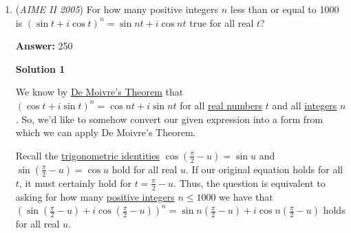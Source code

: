 \begin{enumerate}
 



\textbf{Solution 2}

Call our desired length $x$. Note for any $X$ on $\overline{AB}$ and $Y$ on $\overline{O_1O_2}$ such that $\overline{XY}\perp\overline{AB}$ that the function $f$ such that $f(\overline{O_1Y})=\overline{XY}$ is linear. Since $(0,4)$ and $(14,10)$, we can quickly interpolate that $f(10)=\overline{O_3T}=\frac{58}{7}$. Then, extend $\overline{O_3T}$ until it reaches the circle on both sides; call them $P,Q$. By Power of a Point,$\overline{PT}\cdot\overline{TQ}=\overline{AT}\cdot\overline{TB}$.Since $\overline{AT}=\overline{TB}=\frac{1}{2}x$,
 \[(\overline{PO_3}-\overline{O_3T})(\overline{QO_3}+\overline{O_3T})=\frac{1}{4}x^2\]
 \[\left(14+\frac{58}{7}\right)\left(14-\frac{58}{7}\right)=\frac{1}{4}x^2\]After solving for $x$, we get $x=\frac{8\sqrt{390}}{7}$, so our answer is $8+390+7=\boxed{405}$

 \textbf{Note} this is similar to another aime problem: \href{https://artofproblemsolving.com/wiki/index.php?title=1995\_AIME\_Problems/Problem\_4}{1995 AIME Problems/Problem 4}. This one just requires more work than the other, but the solution is practically identical.

 \textbf{Note to Ambitious Learners} Yes, we have found the length of the common external tangent. What is the length of the chord that is the common internal tangent of $C_1$ and $C_2$?

 


	\item (\textit{AIME II 2005}) For how many positive integers $n$ less than or equal to 1000 is $(\sin t + i \cos t)^n = \sin nt + i \cos nt$ true for all real $t$?


 
 \textbf{Answer: }250



\textbf{Solution 1}

We know by \href{https://artofproblemsolving.com/wiki/index.php?title=De\_Moivre\%27s\_Theorem}{De Moivre's Theorem} that $(\cos t + i \sin t)^n = \cos nt + i \sin nt$ for all \href{https://artofproblemsolving.com/wiki/index.php?title=Real\_number}{real numbers} $t$ and all \href{https://artofproblemsolving.com/wiki/index.php?title=Integer}{integers} $n$.  So, we'd like to somehow convert our given expression into a form from which we can apply De Moivre's Theorem.  

 Recall the \href{https://artofproblemsolving.com/wiki/index.php?title=Trigonometric\_identities}{trigonometric identities} $\cos \left(\frac{\pi}2 - u\right) = \sin u$ and $\sin \left(\frac{\pi}2 - u\right) = \cos u$ hold for all real $u$.  If our original equation holds for all $t$, it must certainly hold for $t = \frac{\pi}2 - u$.  Thus, the question is equivalent to asking for how many \href{https://artofproblemsolving.com/wiki/index.php?title=Positive\_integer}{positive integers} $n \leq 1000$ we have that $\left(\sin\left(\frac\pi2 - u\right) + i \cos\left(\frac\pi 2 - u\right)\right)^n = \sin n \left(\frac\pi2 -u \right) + i\cos n \left(\frac\pi2 - u\right)$ holds for all real $u$.


\end{enumerate}
